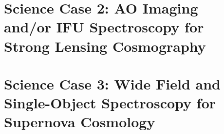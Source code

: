 \documentclass[12pt]{report}
\begin{document}



\section{Science Case 2: AO Imaging and/or IFU Spectroscopy for Strong Lensing Cosmography}



\section{Science Case 3: Wide Field and Single-Object Spectroscopy for Supernova Cosmology}






%


%


%
%
{}

\end{document}
